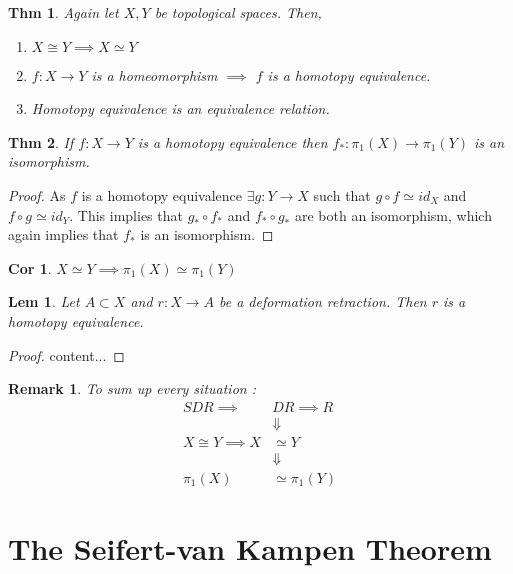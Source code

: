 \documentclass[paper=a4, fontsize=11pt]{scrartcl}
\newtheorem{theorem}{Thm}
\newtheorem{lemma}{Lem}
\newtheorem{corollary}{Cor}
\newtheorem*{remark}{Remark}
\begin{document}
\vspace{0.15in}

\begin{theorem}
Again let $X,Y$ be topological spaces. Then,
\begin{enumerate}[label=\arabic*)]
	\item $X \cong Y \implies X \simeq Y$
	\item $f:X\to Y$ is a homeomorphism $\implies$ $f$ is a homotopy equivalence.
	\item Homotopy equivalence is an equivalence relation.
\end{enumerate}
\end{theorem}

\vspace{0.15in}

\begin{theorem}
If $f:X\to Y$ is a homotopy equivalence then $f_\ast : \pi_1(X) \to \pi_1(Y)$ is an isomorphism.\\
\end{theorem}

\begin{proof}
	As $f$ is a homotopy equivalence $\exists g: Y \to X$ such that $g \circ f \simeq id_X$ and $f \circ g \simeq id_Y$. This implies that $g_\ast \circ f_\ast$ and $f_\ast \circ g_\ast$ are both an isomorphism, which again implies that $f_\ast$ is an isomorphism.
\end{proof}

\vspace{0.15in}

\begin{corollary}
	$X\simeq Y \implies \pi_1(X) \simeq \pi_1(Y)$
\end{corollary}

\vspace{0.15in}

\begin{lemma}
Let $A \subset X$ and $r:X\to A$ be a deformation retraction. Then $r$ is a homotopy equivalence.\\
\end{lemma}

\begin{proof}
	content...
\end{proof}

\vspace{0.15in}

\begin{remark}
To sum up every situation :\\
\begin{equation}\nonumber
\begin{split}
 SDR \implies &DR \implies R \\
 &\Downarrow \\
 X\cong Y \implies X &\simeq Y \\
  &\Downarrow \\
  \pi_1(X) &\simeq \pi_1(Y)
\end{split}
\end{equation}
\end{remark}

\section{The Seifert-van Kampen Theorem}
\end{document}
